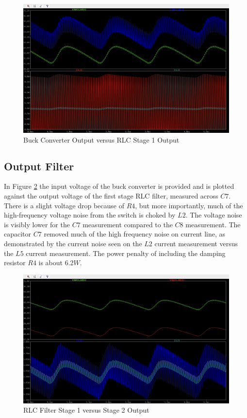 \documentclass[conference]{IEEEtran}
\begin{document}
\begin{figure}[htp]
    \centering
    \includegraphics[width=1.0\linewidth]{buck_converter_and_output_filter_rlc_stage_1.png}
    \caption{Buck Converter Output versus RLC Stage 1 Output}
    \label{fig:buck_converter_voltage_and_output_filter_rlc_filter_stage_1_waveforms}
\end{figure}

\subsection{Output Filter}
In Figure \ref{fig:output_filter_rlc_stage_2_waveforms} the input voltage of the buck converter is provided and is plotted against the output voltage of the first stage RLC filter, measured across $C7$. There is a slight voltage drop because of $R4$, but more importantly, much of the high-frequency voltage noise from the switch is choked by $L2$. The voltage noise is visibly lower for the $C7$ measurement compared to the $C8$ measurement. The capacitor $C7$ removed much of the high frequency noise on current line, as demonstrated by the current noise seen on the $L2$ current measurement versus the $L5$ current measurement. The power penalty of including the damping resistor $R4$ is about 6.2$W$.

\begin{figure}[htp]
    \centering
    \includegraphics[width=1.0\linewidth]{output_filter_rlc_stage_2.png}
    \caption{RLC Filter Stage 1 versus Stage 2 Output}
    \label{fig:output_filter_rlc_stage_2_waveforms}
\end{figure}
\end{document}
